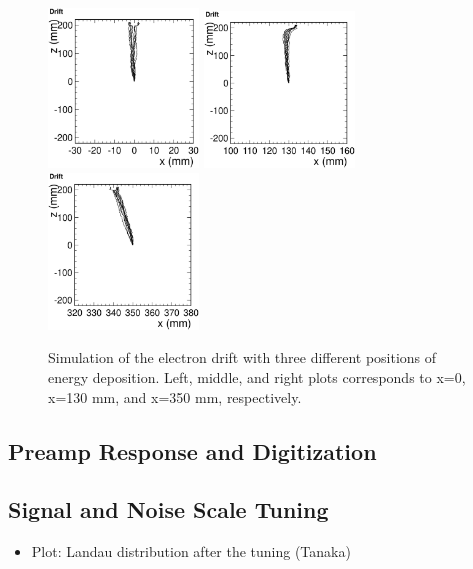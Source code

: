 \begin{figure}[htbp]
 \begin{center}
  \includegraphics[width=40mm]{fig/Drift_0.eps}
  \includegraphics[width=40mm]{fig/Drift_130.eps}
  \includegraphics[width=40mm]{fig/Drift_350.eps}
 \end{center}
 \caption{Simulation of the electron drift with three different positions of energy deposition. Left, middle, and right plots corresponds to x=0, x=130 mm, and x=350 mm, respectively.}
 \label{Fig:DriftSimulation}
\end{figure}



\subsection{Preamp Response and Digitization}





\subsection{Signal and Noise Scale Tuning}
\begin{itemize}
\item Plot: Landau distribution after the tuning  (Tanaka)
\end{itemize}


